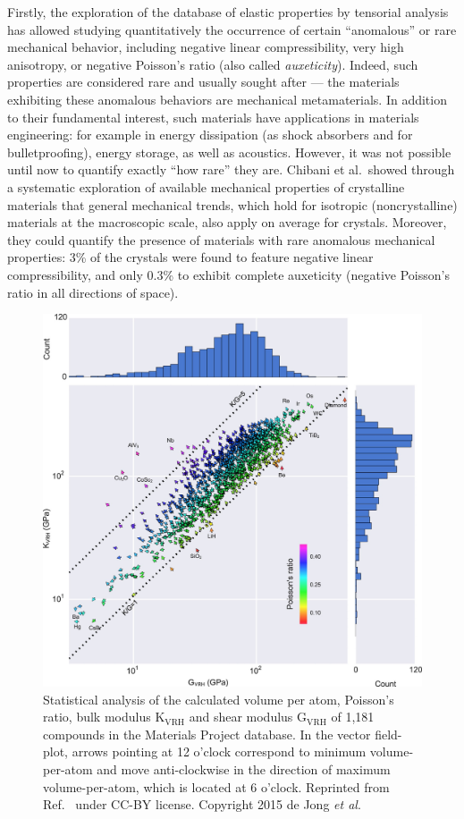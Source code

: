\documentclass[main.tex]{subfiles}
\begin{document}
Firstly, the exploration of the database of elastic properties by tensorial analysis has allowed studying quantitatively the occurrence of certain ``anomalous'' or rare mechanical behavior, including negative linear compressibility, very high anisotropy, or negative Poisson's ratio (also called \emph{auxeticity}). Indeed, such properties are considered rare and usually sought after --- the materials exhibiting these anomalous behaviors are mechanical metamaterials.\cite{Coudert_2019} In addition to their fundamental interest, such materials have applications in materials engineering: for example in energy dissipation (as shock absorbers and for bulletproofing), energy storage, as well as acoustics.\cite{Surjadi_2018} However, it was not possible until now to quantify exactly ``how rare'' they are. Chibani et al.\ showed through a systematic exploration of available mechanical properties of crystalline materials that general mechanical trends, which hold for isotropic (noncrystalline) materials at the macroscopic scale, also apply on average for crystals. Moreover, they could quantify the presence of materials with rare anomalous mechanical properties: {3\%} of the crystals were found to feature negative linear compressibility, and only {0.3\%} to exhibit complete auxeticity (negative Poisson's ratio in all directions of space).

\begin{figure}[ht]
\centering
  \includegraphics[width=0.8\linewidth]{figures/1-screening/deJong2015.jpeg}
  \caption{Statistical analysis of the calculated volume per atom, Poisson's ratio, bulk modulus {$\mathrm{K_{VRH}}$} and shear modulus {$\mathrm{G_{VRH}}$ of} 1,181 compounds in the Materials Project database. In the vector field-plot, arrows pointing at 12 o'clock correspond to minimum volume-per-atom and move anti-clockwise in the direction of maximum volume-per-atom, which is located at 6 o'clock. Reprinted from Ref.~ under CC-BY license. Copyright 2015 de Jong \emph{et al}.}
  \label{fgr:deJong2015}
\end{figure}
\end{document}
